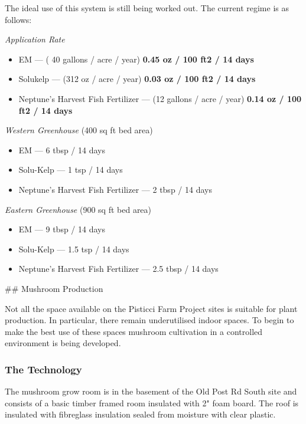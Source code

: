 The ideal use of this system is still being worked out. The current
regime is as follows:

\emph{Application Rate}

\begin{itemize}
\itemsep1pt\parskip0pt
\item
  EM --- ( 40 gallons / acre / year) \textbf{0.45 oz / 100 ft2 / 14
  days}
\item
  Solukelp --- (312 oz / acre / year) \textbf{0.03 oz / 100 ft2 / 14
  days}
\item
  Neptune's Harvest Fish Fertilizer --- (12 gallons / acre / year)
  \textbf{0.14 oz / 100 ft2 / 14 days}
\end{itemize}

\emph{Western Greenhouse} (400 sq ft bed area)

\begin{itemize}
\itemsep1pt\parskip0pt
\item
  EM --- 6 tbsp / 14 days
\item
  Solu-Kelp --- 1 tsp / 14 days
\item
  Neptune's Harvest Fish Fertilizer --- 2 tbsp / 14 days
\end{itemize}

\emph{Eastern Greenhouse} (900 sq ft bed area)

\begin{itemize}
\itemsep1pt\parskip0pt
\item
  EM --- 9 tbsp / 14 days
\item
  Solu-Kelp --- 1.5 tsp / 14 days
\item
  Neptune's Harvest Fish Fertilizer --- 2.5 tbsp / 14 days
\end{itemize}

 \#\# Mushroom Production

Not all the space available on the Pisticci Farm Project sites is
suitable for plant production. In particular, there remain underutilised
indoor spaces. To begin to make the best use of these spaces mushroom
cultivation in a controlled environment is being developed.

\subsubsection{The Technology}\label{the-technology}

The mushroom grow room is in the basement of the Old Post Rd South site
and consists of a basic timber framed room insulated with 2" foam board.
The roof is insulated with fibreglass insulation sealed from moisture
with clear plastic.

